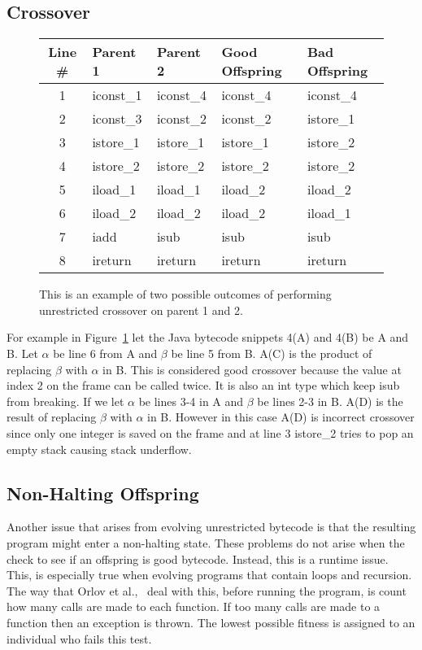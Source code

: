 \documentclass{sig-alternate}
\begin{document}
\subsection{Crossover}

\begin{figure}
\begin{tabular}{|c|l|l|l|l|}

\hline
Line \#&Parent 1&Parent 2&Good Offspring&Bad Offspring\\  \hline
1&iconst\_1&iconst\_4&iconst\_4&iconst\_4\\
2&iconst\_3&iconst\_2&iconst\_2&istore\_1\\
3&istore\_1&istore\_1&istore\_1&istore\_2\\
4&istore\_2&istore\_2&istore\_2&istore\_2\\
5&iload\_1&iload\_1&iload\_2&iload\_2\\
6&iload\_2&iload\_2&iload\_2&iload\_1\\
7&iadd&isub&isub&isub\\
8&ireturn&ireturn&ireturn&ireturn\\
\hline
\end{tabular}
\caption{This is an example of two possible outcomes of performing unrestricted crossover on parent 1 and 2.}
\label{crossover}
  
\end{figure}

For example in Figure~\ref{crossover} let the Java bytecode snippets 4(A) and 4(B) be A and B. Let $\alpha$ be line 6 from A and $\beta$ be line 5 from B. A(C) is the product of replacing $\beta$ with $\alpha$ in B. This is considered good crossover because the value at index 2 on the frame can be called twice. It is also an int type which keep isub from breaking. If we let $\alpha$ be lines 3-4 in A and $\beta$ be lines 2-3 in B. A(D) is the result of replacing $\beta$ with $\alpha$ in B. However in this case A(D) is incorrect crossover since only one integer is saved on the frame and at line 3 istore\_2 tries to pop an empty stack causing stack underflow. 

\subsection{Non-Halting Offspring}
Another issue that arises from evolving unrestricted bytecode is that the resulting program might enter a non-halting state. These problems do not arise when the check to see if an offspring is good bytecode. Instead, this is a runtime issue. This, is especially true when evolving programs that contain loops and recursion.
The way that Orlov et al.,~\cite{FINCH:2011} deal with this, before running the program, is count how many calls are made to each function. If too many calls are made to a function then an exception is thrown. The lowest possible fitness is assigned to an individual who fails this test.
\end{document}
